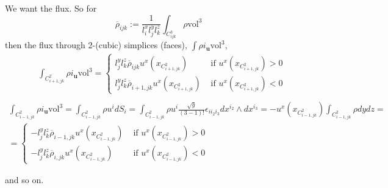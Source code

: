 \documentclass[10pt, landscape]{amsart}
\begin{document}
We want the flux.  So for
\[
\overline{\rho}_{ijk} := \frac{1}{l_i^x l_j^yl^z_k} \int_{C^3_{ijk}} \rho \text{vol}^3
\]
then the flux through 2-(cubic) simplices (faces), $\int \rho i_{\mathbf{u}}\text{vol}^3$,
\[
\begin{aligned}
 &  \int_{C^2_{i+1,jk}} \rho i_{\mathbf{u}} \text{vol}^3 = \begin{cases} l_j^yl_k^z \overline{\rho}_{ijk} u^x(x_{C^2_{i+1, jk} } ) & \text{ if } u^x(x_{C^2_{i+1,jk} }) > 0 \\ 
 l_j^y l^z_k \overline{\rho}_{i+1,jk} u^x(x_{C^2_{i+1, jk} } ) & \text{ if } u^x(x_{C^2_{i+1,jk} }) < 0 \end{cases} \\
\end{aligned}
\]
\[
\begin{gathered}
  \int_{C^2_{i-1,jk}} \rho i_{\mathbf{u}} \text{vol}^3 = \int_{C^2_{i-1,jk}} \rho u^i dS_i = \int_{C^2_{i-1,jk}} \rho u^i \frac{ \sqrt{g}}{ (3-1)!} \epsilon_{ii_2i_3} dx^{i_2} \wedge dx^{i_3} = -u^x(x_{C^2_{i-1,jk}}) \int_{C^2_{i-1,jk} } \rho dy dz = \\
  = \begin{cases}
    -l_j^y l^z_k \overline{\rho}_{i-1,jk} u^x(x_{C^2_{i-1,jk}}) & \text{ if } u^x(x_{C^2_{i-1,jk}}) > 0 \\
        -l_j^y l^z_k \overline{\rho}_{i,jk} u^x(x_{C^2_{i-1,jk}}) & \text{ if } u^x(x_{C^2_{i-1,jk}}) < 0 
    \end{cases}
\end{gathered}
\]

and so on.
\end{document}

